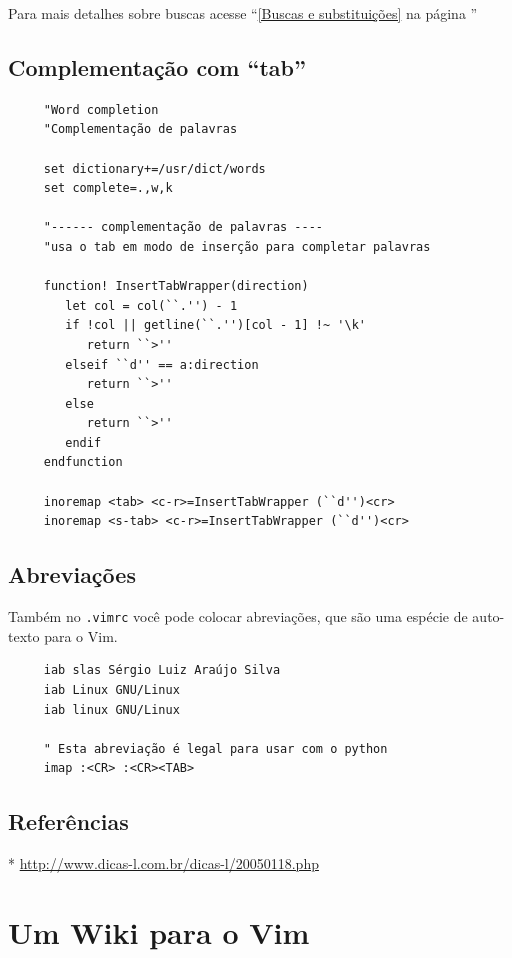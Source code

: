\documentclass[10pt,a4paper,openany]{book}
\begin{document}
Para mais detalhes sobre buscas acesse ``\ref{Buscas e substituições}
na página \pageref{Buscas e substituições}''

\section{Complementação com ``tab''}\label{Complementação com ``tab''}

\begin{verbatim}
     "Word completion
     "Complementação de palavras
     
     set dictionary+=/usr/dict/words
     set complete=.,w,k
     
     "------ complementação de palavras ----
     "usa o tab em modo de inserção para completar palavras
     
     function! InsertTabWrapper(direction)
        let col = col(``.'') - 1
        if !col || getline(``.'')[col - 1] !~ '\k'
           return ``>''
        elseif ``d'' == a:direction
           return ``>''
        else
           return ``>''
        endif
     endfunction
     
     inoremap <tab> <c-r>=InsertTabWrapper (``d'')<cr>
     inoremap <s-tab> <c-r>=InsertTabWrapper (``d'')<cr>
\end{verbatim}

\section{Abreviações}\label{Abreviações}
Também no \verb|.vimrc| você pode colocar abreviações, que são uma espécie de
auto-texto para o Vim.

\begin{verbatim}
     iab slas Sérgio Luiz Araújo Silva
     iab Linux GNU/Linux
     iab linux GNU/Linux
     
     " Esta abreviação é legal para usar com o python
     imap :<CR> :<CR><TAB>
\end{verbatim}

\section{Referências}
\label{Referências}
* \url{http://www.dicas-l.com.br/dicas-l/20050118.php}

\chapter{Um Wiki para o Vim}\label{cha:Um Wiki para o Vim}
\end{document}
